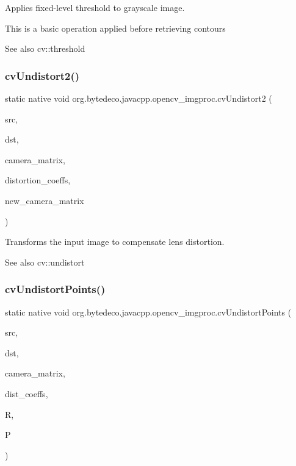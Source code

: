 Applies fixed-\/level threshold to grayscale image. 

This is a basic operation applied before retrieving contours \begin{DoxySeeAlso}{See also}
cv\+::threshold 
\end{DoxySeeAlso}
\mbox{\label{group__imgproc__c_ga2b891154762834fb030334ea95ebdce9}} 
\subsubsection{\texorpdfstring{cv\+Undistort2()}{cvUndistort2()}}
{\footnotesize\ttfamily static native void org.\+bytedeco.\+javacpp.\+opencv\+\_\+imgproc.\+cv\+Undistort2 (\begin{DoxyParamCaption}\item[{@Const Cv\+Arr}]{src,  }\item[{Cv\+Arr}]{dst,  }\item[{@Const Cv\+Mat}]{camera\+\_\+matrix,  }\item[{@Const Cv\+Mat}]{distortion\+\_\+coeffs,  }\item[{@Const Cv\+Mat}]{new\+\_\+camera\+\_\+matrix }\end{DoxyParamCaption})\hspace{0.3cm}{\ttfamily [static]}}



Transforms the input image to compensate lens distortion. 

\begin{DoxySeeAlso}{See also}
cv\+::undistort 
\end{DoxySeeAlso}
\mbox{\label{group__imgproc__c_ga21444b957a9e68dffef016a844ff35a1}} 
\subsubsection{\texorpdfstring{cv\+Undistort\+Points()}{cvUndistortPoints()}}
{\footnotesize\ttfamily static native void org.\+bytedeco.\+javacpp.\+opencv\+\_\+imgproc.\+cv\+Undistort\+Points (\begin{DoxyParamCaption}\item[{@Const Cv\+Mat}]{src,  }\item[{Cv\+Mat}]{dst,  }\item[{@Const Cv\+Mat}]{camera\+\_\+matrix,  }\item[{@Const Cv\+Mat}]{dist\+\_\+coeffs,  }\item[{@Const Cv\+Mat}]{R,  }\item[{@Const Cv\+Mat}]{P }\end{DoxyParamCaption})\hspace{0.3cm}{\ttfamily [static]}}



